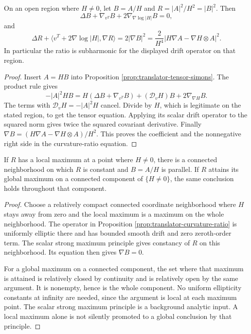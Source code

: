 \begin{proposition}\label{prop:translator-curvature-ratio}
On an open region where $H\ne0$, let $B=A/H$ and $R=|A|^2/H^2=|B|^2$. Then
\[
 \Delta B+\nabla_{v^T}B+2\nabla_{\nabla\log|H|}B=0,
\]
and
\[
 \Delta R+\langle v^T+2\nabla\log|H|,\nabla R\rangle
 =2|\nabla B|^2
 =\frac2{H^4}|H\nabla A-\nabla H\otimes A|^2.
\]
In particular the ratio is subharmonic for the displayed drift operator on that region.
\end{proposition}
\begin{proof}
Insert $A=HB$ into Proposition \ref{prop:translator-tensor-simons}. The product rule gives
\[
 -|A|^2HB=H(\Delta B+\nabla_{v^T}B)
 +(\mathcal D_vH)B+2\nabla_{\nabla H}B.
\]
The terms with $\mathcal D_vH=-|A|^2H$ cancel. Divide by $H$, which is legitimate on the stated region, to get the tensor equation. Applying its scalar drift operator to the squared norm gives twice the squared covariant derivative. Finally $\nabla B=(H\nabla A-\nabla H\otimes A)/H^2$. This proves the coefficient and the nonnegative right side in the curvature-ratio equation.
\end{proof}

\begin{proposition}\label{prop:translator-ratio-maximum}
If $R$ has a local maximum at a point where $H\ne0$, there is a connected neighborhood on which $R$ is constant and $B=A/H$ is parallel. If $R$ attains its global maximum on a connected component of $\{H\ne0\}$, the same conclusion holds throughout that component.
\end{proposition}
\begin{proof}
Choose a relatively compact connected coordinate neighborhood where $H$ stays away from zero and the local maximum is a maximum on the whole neighborhood. The operator in Proposition \ref{prop:translator-curvature-ratio} is uniformly elliptic there and has bounded smooth drift and zero zeroth-order term. The scalar strong maximum principle gives constancy of $R$ on this neighborhood. Its equation then gives $\nabla B=0$.

For a global maximum on a connected component, the set where that maximum is attained is relatively closed by continuity and is relatively open by the same argument. It is nonempty, hence is the whole component. No uniform ellipticity constants at infinity are needed, since the argument is local at each maximum point. The scalar strong maximum principle is a background analytic input. A local maximum alone is not silently promoted to a global conclusion by that principle.
\end{proof}

